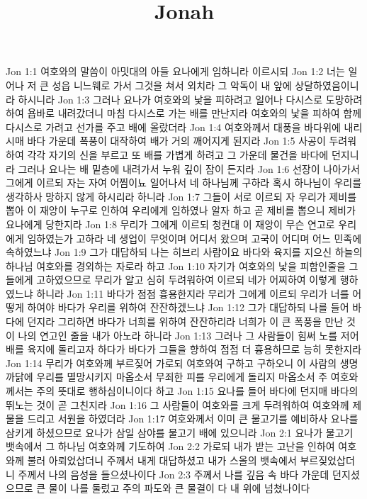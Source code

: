 

\title{Jonah}

Jon 1:1  여호와의 말씀이 아밋대의 아들 요나에게 임하니라 이르시되
Jon 1:2  너는 일어나 저 큰 성읍 니느웨로 가서 그것을 쳐서 외치라 그 악독이 내 앞에 상달하였음이니라 하시니라
Jon 1:3  그러나 요나가 여호와의 낯을 피하려고 일어나 다시스로 도망하려 하여 욥바로 내려갔더니 마침 다시스로 가는 배를 만난지라 여호와의 낯을 피하여 함께 다시스로 가려고 선가를 주고 배에 올랐더라
Jon 1:4  여호와께서 대풍을 바다위에 내리시매 바다 가운데 폭풍이 대작하여 배가 거의 깨어지게 된지라
Jon 1:5  사공이 두려워 하여 각각 자기의 신을 부르고 또 배를 가볍게 하려고 그 가운데 물건을 바다에 던지니라 그러나 요나는 배 밑층에 내려가서 누워 깊이 잠이 든지라
Jon 1:6  선장이 나아가서 그에게 이르되 자는 자여 어찜이뇨 일어나서 네 하나님께 구하라 혹시 하나님이 우리를 생각하사 망하지 않게 하시리라 하니라
Jon 1:7  그들이 서로 이르되 자 우리가 제비를 뽑아 이 재앙이 누구로 인하여 우리에게 임하였나 알자 하고 곧 제비를 뽑으니 제비가 요나에게 당한지라
Jon 1:8  무리가 그에게 이르되 청컨대 이 재앙이 무슨 연고로 우리에게 임하였는가 고하라 네 생업이 무엇이며 어디서 왔으며 고국이 어디며 어느 민족에 속하였느냐
Jon 1:9  그가 대답하되 나는 히브리 사람이요 바다와 육지를 지으신 하늘의 하나님 여호와를 경외하는 자로라 하고
Jon 1:10  자기가 여호와의 낯을 피함인줄을 그들에게 고하였으므로 무리가 알고 심히 두려워하여 이르되 네가 어찌하여 이렇게 행하였느냐 하니라
Jon 1:11  바다가 점점 흉용한지라 무리가 그에게 이르되 우리가 너를 어떻게 하여야 바다가 우리를 위하여 잔잔하겠느냐
Jon 1:12  그가 대답하되 나를 들어 바다에 던지라 그리하면 바다가 너희를 위하여 잔잔하리라 너희가 이 큰 폭풍을 만난 것이 나의 연고인 줄을 내가 아노라 하니라
Jon 1:13  그러나 그 사람들이 힘써 노를 저어 배를 육지에 돌리고자 하다가 바다가 그들을 향하여 점점 더 흉용하므로 능히 못한지라
Jon 1:14  무리가 여호와께 부르짖어 가로되 여호와여 구하고 구하오니 이 사람의 생명 까닭에 우리를 멸망시키지 마옵소서 무죄한 피를 우리에게 돌리지 마옵소서 주 여호와께서는 주의 뜻대로 행하심이니이다 하고
Jon 1:15  요나를 들어 바다에 던지매 바다의 뛰노는 것이 곧 그친지라
Jon 1:16  그 사람들이 여호와를 크게 두려워하여 여호와께 제물을 드리고 서원을 하였더라
Jon 1:17  여호와께서 이미 큰 물고기를 예비하사 요나를 삼키게 하셨으므로 요나가 삼일 삼야를 물고기 배에 있으니라
Jon 2:1  요나가 물고기 뱃속에서 그 하나님 여호와께 기도하여
Jon 2:2  가로되 내가 받는 고난을 인하여 여호와께 불러 아뢰었삽더니 주께서 내게 대답하셨고 내가 스올의 뱃속에서 부르짖었삽더니 주께서 나의 음성을 들으셨나이다
Jon 2:3  주께서 나를 깊음 속 바다 가운데 던지셨으므로 큰 물이 나를 둘렀고 주의 파도와 큰 물결이 다 내 위에 넘쳤나이다
